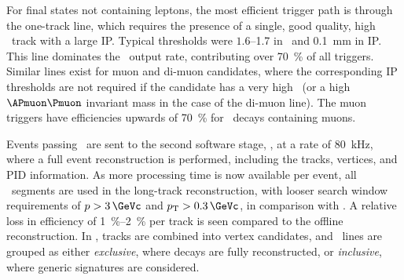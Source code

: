 For final states not containing leptons, the most efficient trigger path is 
through the one-track line, which requires the presence of a single, good 
quality, high \pT\ track with a large \ac{IP}.
Typical thresholds were $1.6$--\SI{1.7}{\GeVc} in \pT\ and 
\SI{0.1}{\milli\metre} in \ac{IP}.
This line dominates the \hltone\ output rate, contributing over 
\SI{70}{\percent} of all triggers.
Similar lines exist for muon and di-muon candidates, where the corresponding 
\ac{IP} thresholds are not required if the candidate has a very high \pT\ (or a 
high $\APmuon\Pmuon$ invariant mass in the case of the di-muon line).
The muon triggers have efficiencies upwards of \SI{70}{\percent} for \PB\ 
decays containing muons.

Events passing \hltone\ are sent to the second software stage, \hlttwo, at a 
rate of \SI{80}{\kilo\hertz}, where a full event reconstruction is performed, 
including the tracks, vertices, and \ac{PID} information.
As more processing time is now available per event, all \velo\ segments are 
used in the long-track reconstruction, with looser search window requirements 
of $\ptot > \SI{3}{\GeVc}$ and $\pT > \SI{0.3}{\GeVc}$, in comparison with 
\hltone.
A relative loss in efficiency of \SIrange{1}{2}{\percent} per track is seen 
compared to the offline reconstruction.
In \hlttwo, tracks are combined into vertex candidates, and \hlttwo\ lines are 
grouped as either \emph{exclusive}, where decays are fully reconstructed, or 
\emph{inclusive}, where generic signatures are considered.

